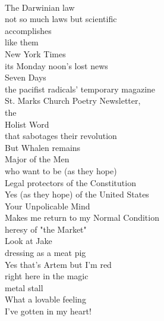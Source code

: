 \documentclass[smalldemyvopaper,11pt,twoside,onecolumn,openright,extrafontsizes]{memoir}
\begin{document}
\\The Darwinian law
\\not so much laws but scientific
\\accomplishes
\\like them
\\New York Times
\\its Monday noon's lost news
\\Seven Days
\\the pacifist radicals' temporary magazine
\\St. Marks Church Poetry Newsletter,
\\the
\\Holist Word
\\that sabotages their revolution
\\But Whalen remains
\\Major of the Men
\\who want to be (as they hope)
\\Legal protectors of the Constitution
\\Yes (as they hope) of the United States
\\Your Unpolicable Mind
\\Makes me return to my Normal Condition
\\heresy of "the Market"
\\Look at Jake
\\dressing as a meat pig
\\Yes that's Artem but I'm red
\\right here in the magic
\\metal stall
\\What a lovable feeling
\\I've gotten in my heart!
\end{document}
